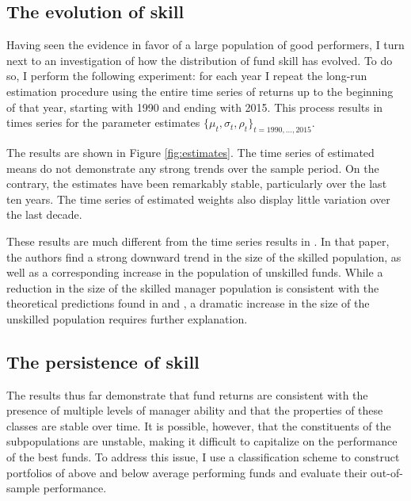 	\subsection{The evolution of skill}
		Having seen the evidence in favor of a large population of good performers, I turn next to an investigation of how the distribution of fund skill has evolved. To do so, I perform the following experiment: for each year I repeat the long-run estimation procedure using the entire time series of returns up to the beginning of that year, starting with 1990 and ending with 2015. This process results in times series for the parameter estimates $\{\mu_t, \sigma_t, \rho_t\}_{t=1990,\dots,2015}$.

		The results are shown in Figure \ref{fig:estimates}. The time series of estimated means do not demonstrate any strong trends over the sample period. On the contrary, the estimates have been remarkably stable, particularly over the last ten years. The time series of estimated weights also display little variation over the last decade.

		These results are much different from the time series results in \citet{Barras2010}.  In that paper, the authors find a strong downward trend in the size of the skilled population, as well as a corresponding increase in the population of unskilled funds.  While a reduction in the size of the skilled manager population is consistent with the theoretical predictions found in \citet{Berk2004} and \citet{Pastor2012}, a dramatic increase in the size of the unskilled population requires further explanation.

	\subsection{The persistence of skill}
		The results thus far demonstrate that fund returns are consistent with the presence of multiple levels of manager ability and that the properties of these classes are stable over time. It is possible, however, that the constituents of the subpopulations are unstable, making it difficult to capitalize on the performance of the best funds. To address this issue, I use a classification scheme to construct portfolios of above and below average performing funds and evaluate their out-of-sample performance.

